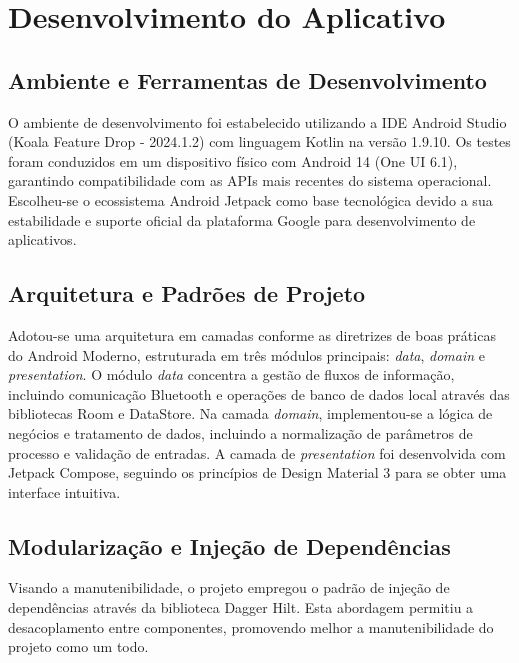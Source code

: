 

\section{Desenvolvimento do Aplicativo}
\subsection{Ambiente e Ferramentas de Desenvolvimento}

O ambiente de desenvolvimento foi estabelecido utilizando a IDE Android Studio (Koala Feature Drop - 2024.1.2) com linguagem Kotlin na versão 1.9.10. Os testes foram conduzidos em um dispositivo físico com Android 14 (One UI 6.1), garantindo compatibilidade com as APIs mais recentes do sistema operacional. Escolheu-se o ecossistema Android Jetpack como base tecnológica devido a sua estabilidade e suporte oficial da plataforma Google para desenvolvimento de aplicativos.

\subsection{Arquitetura e Padrões de Projeto}

Adotou-se uma arquitetura em camadas conforme as diretrizes de boas práticas do Android Moderno, estruturada em três módulos principais: \textit{data}, \textit{domain} e \textit{presentation}. O módulo \textit{data} concentra a gestão de fluxos de informação, incluindo comunicação Bluetooth e operações de banco de dados local através das bibliotecas Room e DataStore. Na camada \textit{domain}, implementou-se a lógica de negócios e tratamento de dados, incluindo a normalização de parâmetros de processo e validação de entradas. A camada de \textit{presentation} foi desenvolvida com Jetpack Compose, seguindo os princípios de Design Material 3 para se obter uma interface intuitiva.

\subsection{Modularização e Injeção de Dependências}

Visando a manutenibilidade, o projeto empregou o padrão de injeção de dependências através da biblioteca Dagger Hilt. Esta abordagem permitiu a desacoplamento entre componentes, promovendo melhor a manutenibilidade do projeto como um todo. 

